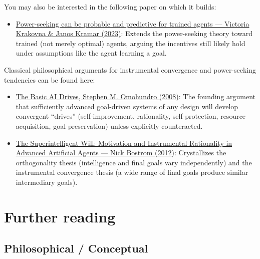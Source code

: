 \documentclass[11pt]{article}
\begin{document}
You may also be interested in the following paper on which it builds:

\begin{itemize}
  \item \href{https://arxiv.org/abs/2304.06528}{Power-seeking can be probable and predictive for trained agents --- Victoria Krakovna \& Janos Kramar (2023)}: Extends the power-seeking theory toward trained (not merely optimal) agents, arguing the incentives still likely hold under assumptions like the agent learning a goal.
\end{itemize}

Classical philosophical arguments for instrumental convergence and power-seeking tendencies can be found here:

\begin{itemize}
  \item \href{https://selfawaresystems.com/wp-content/uploads/2008/01/ai_drives_final.pdf}{The Basic AI Drives, Stephen M. Omohundro (2008)}: The founding argument that sufficiently advanced goal-driven systems of any design will develop convergent ``drives'' (self-improvement, rationality, self-protection, resource acquisition, goal-preservation) unless explicitly counteracted.
  \item \href{https://nickbostrom.com/superintelligentwill.pdf}{The Superintelligent Will: Motivation and Instrumental Rationality in Advanced Artificial Agents --- Nick Bostrom (2012)}: Crystallizes the orthogonality thesis (intelligence and final goals vary independently) and the instrumental convergence thesis (a wide range of final goals produce similar intermediary goals).
\end{itemize}

\section*{Further reading}

\subsection*{Philosophical / Conceptual}
\end{document}
